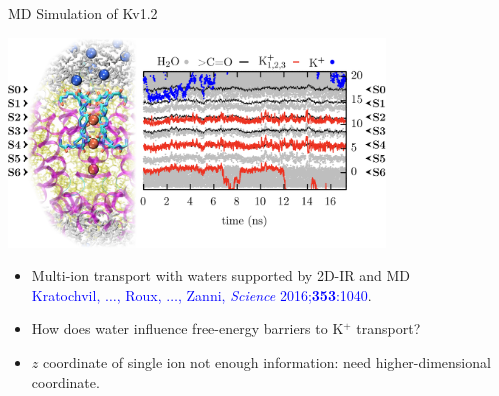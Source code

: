 \begin{frame}{MD Simulation of Kv1.2}
\begin{center}
\includegraphics[width=0.75\textwidth]{k12v_md.png}
\end{center}
\begin{itemize}
\item Multi-ion transport with waters supported by 2D-IR and MD\\ {\textcolor{blue}{\small Kratochvil, $\dots$, Roux, $\dots$, Zanni, {\em Science} 2016;{\bf 353}:1040}}.
\item How does water influence free-energy barriers to K$^+$ transport?
\item $z$ coordinate of single ion not enough information:  need higher-dimensional coordinate.
\end{itemize}
\end{frame}

